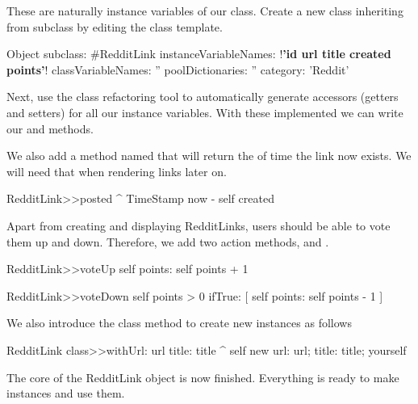 \documentclass[a4paper,10pt,twoside]{book}
\begin{document}
These are naturally instance variables of our class. Create a new class inheriting from  subclass by editing the class template.

\begin{code}{}
Object subclass: #RedditLink 
   instanceVariableNames: !\textbf{'id url title created points'}! 
   classVariableNames: '' 
   poolDictionaries: '' 
   category: 'Reddit'
\end{code}

Next,  use the class refactoring tool to automatically generate accessors (getters and setters) for all our instance variables. With these implemented we can write our  and  methods.


We also add a method named   that will return the  of time the link now exists. 
We will need that when rendering links later on. 
\begin{code}{}
RedditLink>>posted
    ^ TimeStamp now - self created
\end{code}

Apart from creating and displaying RedditLinks, users should be able to vote them up and down. Therefore, we add two action methods,  and .

\begin{code}{}
RedditLink>>voteUp
    self points: self points + 1

RedditLink>>voteDown
    self points > 0 ifTrue: [ self points: self points - 1 ]
\end{code}


We also introduce the class method  to create new instances as follows

\begin{code}{}
RedditLink class>>withUrl: url title: title
   ^ self new url: url; title: title; yourself
\end{code}

The core of the RedditLink object is now finished. Everything is ready to make instances and use them.
\end{document}
